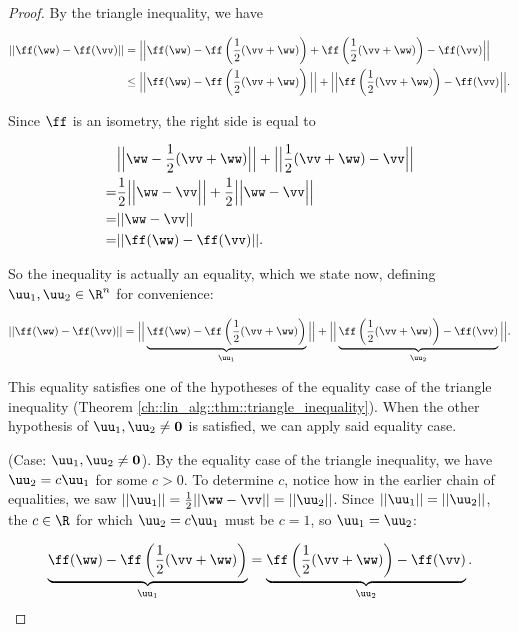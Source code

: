 \begin{proof}
	By the triangle inequality, we have
	
	\begin{align*}
		||\ff(\ww) - \ff(\vv)|| &= \Big|\Big|\ff(\ww) - \ff\left(\frac{1}{2}(\vv + \ww)\right) + \ff\left(\frac{1}{2}(\vv + \ww)\right) - \ff(\vv) \Big|\Big| \\
		&\leq \Big|\Big|\ff(\ww) - \ff\left( \frac{1}{2}(\vv + \ww)\right)\Big|\Big| + \Big|\Big|\ff\left(\frac{1}{2}(\vv + \ww)\right) - \ff(\vv)\Big|\Big|.
	\end{align*}
	
	Since $\ff$ is an isometry, the right side is equal to
	
	\begin{align*}
		&\Big|\Big|\ww - \frac{1}{2}(\vv + \ww)\Big|\Big| + \Big|\Big|\frac{1}{2}(\vv + \ww) - \vv\Big|\Big| \\
		= &\frac{1}{2}\Big|\Big|\ww - \vv\Big|\Big| + \frac{1}{2}\Big|\Big|\ww - \vv\Big|\Big| \\
		= &||\ww - \vv|| \\
		= &||\ff(\ww) - \ff(\vv)||.
	\end{align*}
	
	So the inequality is actually an equality, which we state now, defining $\uu_1, \uu_2 \in \R^n$ for convenience:
	
	\begin{align*}
		||\ff(\ww) - \ff(\vv)|| = \Big|\Big|\underbrace{\ff(\ww) - \ff\left( \frac{1}{2}(\vv + \ww)\right)}_{\uu_1}\Big|\Big| + \Big|\Big|\underbrace{\ff\left(\frac{1}{2}(\vv + \ww)\right) - \ff(\vv)}_{\uu_2}\Big|\Big|.
	\end{align*}
	
	This equality satisfies one of the hypotheses of the equality case of the triangle inequality (Theorem \ref{ch::lin_alg::thm::triangle_inequality}). When the other hypothesis of $\uu_1, \uu_2 \neq \mathbf{0}$ is satisfied, we can apply said equality case.
	
	(Case: $\uu_1, \uu_2 \neq \mathbf{0}$). By the equality case of the triangle inequality, we have $\uu_2 = c\uu_1$ for some $c > 0$. To determine $c$, notice how in the earlier chain of equalities, we saw $||\uu_1|| = \frac{1}{2}||\ww - \vv|| = ||\uu_2||$. Since $||\uu_1|| = ||\uu_2||$, the $c \in \R$ for which $\uu_2 = c\uu_1$ must be $c = 1$, so $\uu_1 = \uu_2$:
	
	\begin{align*}
		\underbrace{\ff(\ww) - \ff\left( \frac{1}{2}(\vv + \ww)\right)}_{\uu_1} = \underbrace{\ff\left(\frac{1}{2}(\vv + \ww)\right) - \ff(\vv)}_{\uu_2}.
	\end{align*}
	

\end{proof}
